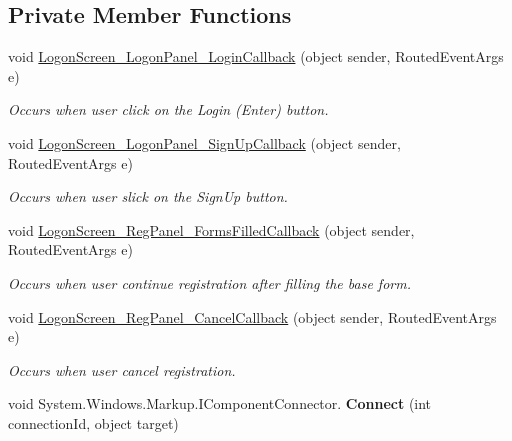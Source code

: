 \subsection*{Private Member Functions}
\begin{DoxyCompactItemize}
\item 
void \mbox{\hyperlink{class_logon_screen_1_1_main_window_a5256e3a52a0ed2631e83c21ffa809c59}{Logon\+Screen\+\_\+\+Logon\+Panel\+\_\+\+Login\+Callback}} (object sender, Routed\+Event\+Args e)
\begin{DoxyCompactList}\small\item\em Occurs when user click on the Login (Enter) button. \end{DoxyCompactList}\item 
void \mbox{\hyperlink{class_logon_screen_1_1_main_window_ac20d764c002625f9f4d8f642a0759443}{Logon\+Screen\+\_\+\+Logon\+Panel\+\_\+\+Sign\+Up\+Callback}} (object sender, Routed\+Event\+Args e)
\begin{DoxyCompactList}\small\item\em Occurs when user slick on the Sign\+Up button. \end{DoxyCompactList}\item 
void \mbox{\hyperlink{class_logon_screen_1_1_main_window_af3286c0d6a22a24750b1a831f6d738fd}{Logon\+Screen\+\_\+\+Reg\+Panel\+\_\+\+Forms\+Filled\+Callback}} (object sender, Routed\+Event\+Args e)
\begin{DoxyCompactList}\small\item\em Occurs when user continue registration after filling the base form. \end{DoxyCompactList}\item 
void \mbox{\hyperlink{class_logon_screen_1_1_main_window_ae04ea4e75e12e393191de155664f5292}{Logon\+Screen\+\_\+\+Reg\+Panel\+\_\+\+Cancel\+Callback}} (object sender, Routed\+Event\+Args e)
\begin{DoxyCompactList}\small\item\em Occurs when user cancel registration. \end{DoxyCompactList}\item 
\mbox{\label{class_logon_screen_1_1_main_window_a564b2b937f5fee50c46f795e70142f07}} 
void System.\+Windows.\+Markup.\+I\+Component\+Connector. {\bfseries Connect} (int connection\+Id, object target)
\item 
\mbox{\label{class_logon_screen_1_1_main_window_a564b2b937f5fee50c46f795e70142f07}} 

\end{DoxyCompactItemize}
